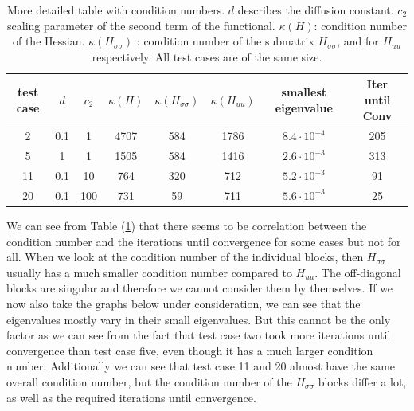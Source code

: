 \documentclass[../draft_1.tex]{subfiles}
\begin{document}
\begin{table}
	\centering
	\begin{tabular}{|c|c|c|c|c|c|c|c|}
		\hline
		test case & $d$ & $c_2$& $\kappa(H)$ & $\kappa(H_{\sigma \sigma})$ & $\kappa(H_{u u})$ & smallest eigenvalue & Iter until Conv \\ \hline
		\toprule
		2& 0.1&1& 4707& 584 &  1786& $8.4 \cdot 10^{-4}$ & 205 \\ \hline
		5& 1&1& 1505 & 584 & 1416 & $2.6 \cdot 10^{-3}$ &313 \\ \hline
		11& 0.1&10&764 & 320 & 712 & $5.2 \cdot 10^{-3}$ &91 \\ \hline
		20& 0.1&100&731 & 59 &  711&$5.6 \cdot 10^{-3}$ &25 \\ \hline
	\end{tabular}
	\caption{More detailed table with condition numbers. $d$ describes the diffusion constant. $c_2$ scaling parameter of the second term of the functional. $\kappa(H)$: condition number of the Hessian. $\kappa(H_{\sigma \sigma})$ : condition number of the submatrix $H_{\sigma \sigma}$, and for $H_{uu}$ respectively. All test cases are of the same size.}
	\label{table:cond_number_eig_val}
\end{table}
We can see from Table (\ref{table:cond_number_eig_val}) that there seems to be correlation between the condition number and the iterations until convergence for some cases but not for all. When we look at the condition number of the individual blocks, then $H_{\sigma \sigma}$ usually has a much smaller condition number compared to $H_{uu}$. The off-diagonal blocks are singular and therefore we cannot consider them by themselves. If we now also take the graphs below under consideration, we can see that the eigenvalues mostly vary in their small eigenvalues. But this cannot be the only factor as we can see from the fact that test case two took more iterations until convergence than test case five, even though it has a much larger condition number. Additionally we can see that test case 11 and 20 almost have the same overall condition number, but the condition number of the $H_{\sigma \sigma}$ blocks differ a lot, as well as the required iterations until convergence. 
\end{document}
